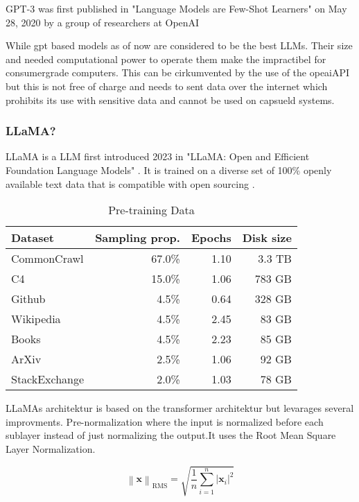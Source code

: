 GPT-3 was first published in "Language Models are Few-Shot Learners" on May 28, 2020
by a group of researchers at OpenAI

While gpt based models as of now are considered to be the best LLMs. Their size and needed computational power to operate them make the impractibel for consumergrade computers. This can be cirkumvented by the use of the opeaiAPI but this is not free of charge and needs to sent data over the internet which prohibits its use with sensitive data and cannot be used on capsueld systems. 

\subsubsection{LLaMA?} 
LLaMA is a LLM first introduced 2023 in "LLaMA: Open and Efficient Foundation Language Models"\cite{touvron2023llama} . It is trained on a diverse set of  100\% openly available text data that is compatible with open sourcing\cite{touvron2023llama} .


\begin{table}[htbp]
\centering
\caption{Pre-training Data\cite{touvron2023llama}}
\begin{tabular}{|l|r|r|r|}
\hline
\textbf{Dataset} & \textbf{Sampling prop.} & \textbf{Epochs} & \textbf{Disk size} \\
\hline
CommonCrawl & 67.0\% & 1.10 & 3.3 TB \\
C4 & 15.0\% & 1.06 & 783 GB \\
Github & 4.5\% & 0.64 & 328 GB \\
Wikipedia & 4.5\% & 2.45 & 83 GB \\
Books & 4.5\% & 2.23 & 85 GB \\
ArXiv & 2.5\% & 1.06 & 92 GB \\
StackExchange & 2.0\% & 1.03 & 78 GB \\
\hline
\end{tabular}
\end{table}

LLaMAs architektur is based on the transformer architektur but levarages several improvments. Pre-normalization where the input is normalized before each sublayer instead  of just normalizing the output.It uses the Root Mean Square Layer Normalization\cite{zhang2019root}.

\newcommand{\norm}[1]{\left\lVert#1\right\rVert}

\[
\norm{\mathbf{x}}_{\text{RMS}} = \sqrt{\frac{1}{n} \sum_{i=1}^n |\mathbf{x}_i|^2}
\]


